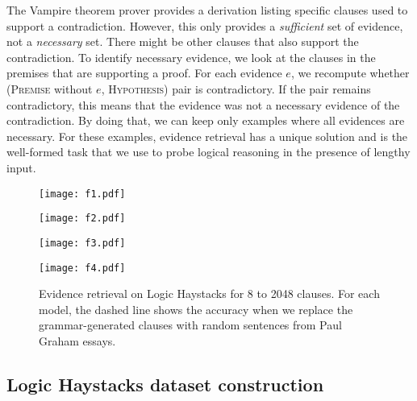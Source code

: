 \documentclass[11pt]{article}
\begin{document}
The Vampire theorem prover provides a derivation listing specific clauses used to support a contradiction.
However, this only provides a \textit{sufficient} set of evidence, not a \textit{necessary} set. There might be other clauses that also support the contradiction.
To identify necessary evidence, we look at the clauses in the premises that are supporting a proof.
For each evidence $e$, we recompute whether (\textsc{Premise} without $e$, \textsc{Hypothesis}) pair is contradictory. If the pair remains contradictory, this means that the evidence was not a necessary evidence of the contradiction. By doing that, we can keep only examples where all evidences are necessary.
For these examples, evidence retrieval has a unique solution and is the well-formed task that we use to probe logical reasoning in the presence of lengthy input.

\begin{figure*}[htb]
  \centering
  \begin{minipage}{0.5\textwidth}
    \centering
    \texttt{[image: f1.pdf]}
    \label{fig:zs1a}
  \end{minipage}%
  \begin{minipage}{0.5\textwidth}
    \centering
    \texttt{[image: f2.pdf]}
    \label{fig:zs1b}
  \end{minipage}\par\medskip
  \begin{minipage}{0.5\textwidth}
    \centering
    \texttt{[image: f3.pdf]}
    \label{fig:zs1c}
  \end{minipage}%
  \begin{minipage}{0.5\textwidth}
    \centering
    \texttt{[image: f4.pdf]}
    \label{fig:zs1d}
  \end{minipage}
  \caption{Evidence retrieval on Logic Haystacks for 8 to 2048 clauses. For each model, the dashed line shows the accuracy when we replace the grammar-generated clauses with random sentences from Paul Graham essays.}
  \label{fig:zs1}
\end{figure*}



\subsection{Logic Haystacks dataset construction}
\end{document}
